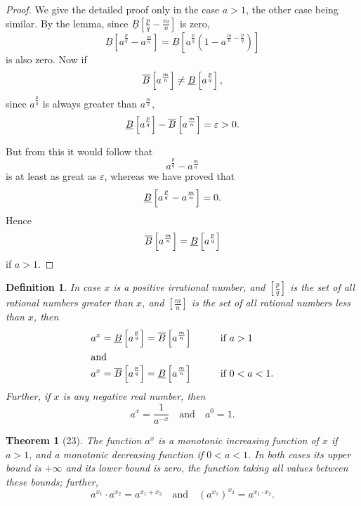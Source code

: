 \documentclass[a4paper,12pt]{book}[2004/02/16]
\providecommand{\colorbox}[2]{#2}
\newcommand{\correction}[2]{\colorbox{corr}{#1}}
\providecommand{\hypertarget}[2]{#2}
\theoremstyle{ilemma}
\theoremstyle{itheorem}
\newtheorem{theorem}{Theorem}
\theoremstyle{iother}
\theoremstyle{icorollary}
\theoremstyle{numcorollary}
\theoremstyle{idefinition}
\newtheorem*{definition}{Definition}
\renewcommand{\dfrac}[2]{\frac{#1}{#2}}%
\begin{document}
\begin{proof}
We give the detailed proof only in the case $a>1$, the other case
being similar. By the lemma, since
$\underline{B}\left[\frac{p}{q}-\frac{m}{n}\right]$ is zero,
\[
  \underline{B}\left[ a^{\frac pq}-\text{\correction{$a^{\frac mn}$}{$a^m_n$}}\right]
  = \underline{B}\left[
  a^\frac pq \left(1-a^{\frac mn-\frac pq} \right) \right]
\]
is also zero. Now if
\[
  \overline{B}\left[a^{\frac{m\vphantom{p}}{n}}\right] \neq
  \underline{B}\left[a^{\frac pq}\right],
\]
since $a^{\frac pq}$ is always greater than $a^\frac mn$,
\[
  \underline{B}\left[a^\frac pq\right]-
  \overline{B}\left[a^\frac{m\vphantom{p}}{n}\right] = \varepsilon > 0.
\]

But from this it would follow that
\[
  a^\frac pq-a^\frac mn
\]
is at least as great as $\varepsilon$, whereas we have proved that
\[
  \underline{B}\left[a^\frac pq-a^\frac mn \right] = 0.\\
\]
Hence
\[
  \overline{B}\left[a^\frac{m\vphantom{p}}{n}\right] =
  \underline{B}\left[a^\frac pq\right]
\]
if $a>1$.
\end{proof}

\begin{definition}\label{dp57}In case $x$ is a positive irrational number,
and $\left[\dfrac{p}{q}\right]$ is the set of all rational numbers
greater than $x$, and $\left[\dfrac{m}{n}\right]$ is the set of all
rational numbers less than $x$, then
\begin{alignat*}{2}
  a^x &= \underline{B}\left[a^\frac pq\right] =
  \overline{B}\left[a^\frac{m\vphantom{p}}{n}\right]&\qquad&\text{if $a> 1$}\\
\intertext{and}
   a^x &= \overline{B}\left[a^\frac pq\right] =
  \underline{B}\left[a^\frac{m\vphantom{p}}{n}\right]&&\text{if $0<a<1$.}
\end{alignat*}
Further, if $x$ is any negative real number, then
\[
  a^x = \frac{1}{a^{-x}} \quad\text{and}\quad a^0=1.
\]
\end{definition}

\begin{theorem}[23]\hypertarget{thm23}{}
The function $a^x$ is a monotonic increasing function of $x$ if $a>1$,
and a monotonic decreasing function if $0<a<1$.  In both cases its
upper bound is $+\infty$ and its lower bound is zero, the function
taking all values between these bounds; further,
\[
  a^{x_1}\cdot a^{x_2}=a^{x_1+x_2} \quad\text{and}\quad
 (a^{x_1})^{x_2}=a^{x_1\cdot x_2}.
\]
\end{theorem}
\end{document}
